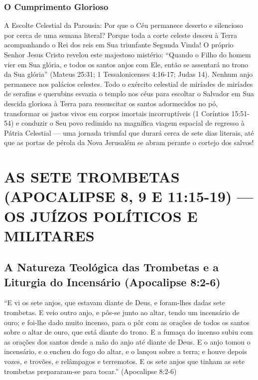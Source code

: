 \documentclass[11pt,a4paper,openany]{book}
\begin{document}
\subsubsection*{O Cumprimento Glorioso}
A Escolte Celestial da Parousia:
Por que o Céu permanece deserto e silencioso por cerca de uma semana literal?
Porque toda a corte celeste desceu à Terra acompanhando o Rei dos reis em Sua triunfante Segunda Vinda!
O próprio Senhor Jesus Cristo revelou este majestoso mistério: ``Quando o Filho do homem vier em Sua glória, e todos os santos anjos com Ele, então se assentará no trono da Sua glória'' (Mateus 25:31; 1 Tessalonicenses 4:16-17; Judas 14). Nenhum anjo permanece nos palácios celestes. Todo o exército celestial de miríades de miríades de serafins e querubins esvazia o templo nos céus para escoltar o Salvador em Sua descida gloriosa à Terra para ressuscitar os santos adormecidos no pó, transformar os justos vivos em corpos imortais incorruptíveis (1 Coríntios 15:51-54) e conduzir o Seu povo redimido na magnífica viagem espacial de regresso à Pátria Celestial — uma jornada triunfal que durará cerca de sete dias literais, até que as portas de pérola da Nova Jerusalém se abram perante o cortejo dos salvos!


\section{AS SETE TROMBETAS (APOCALIPSE 8, 9 E 11:15-19) — OS JUÍZOS POLÍTICOS E MILITARES}



\subsection{A Natureza Teológica das Trombetas e a Liturgia do Incensário (Apocalipse 8:2-6)}


``E vi os sete anjos, que estavam diante de Deus, e foram-lhes dadas sete trombetas. E veio outro anjo, e pôs-se junto ao altar, tendo um incensário de ouro; e foi-lhe dado muito incenso, para o pôr com as orações de todos os santos sobre o altar de ouro, que está diante do trono. E a fumaça do incenso subiu com as orações dos santos desde a mão do anjo até diante de Deus. E o anjo tomou o incensário, e o encheu do fogo do altar, e o lançou sobre a terra; e houve depois vozes, e trovões, e relâmpagos e terremotos. E os sete anjos que tinham as sete trombetas prepararam-se para tocar.'' (Apocalipse 8:2-6)
\end{document}
